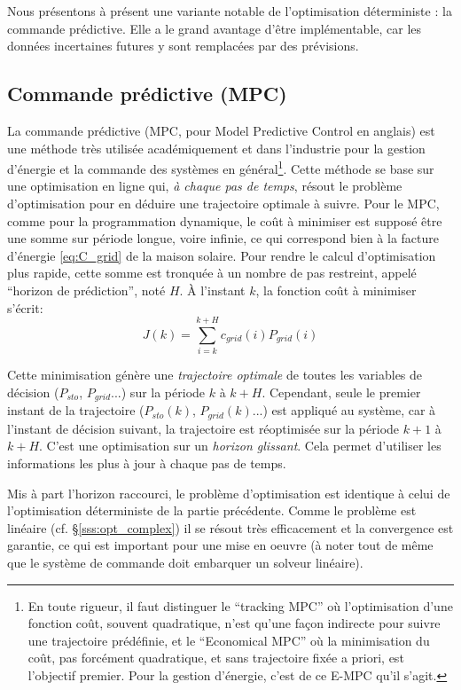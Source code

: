 \documentclass[a4paper,10pt,twocolumn]{article}
\begin{document}
Nous présentons à présent une variante notable de l'optimisation déterministe : la commande prédictive.
Elle a le grand avantage d'être implémentable, car les données incertaines futures y sont remplacées
par des prévisions.

\subsection{Commande prédictive (MPC)}
\label{ss:mpc}

La commande prédictive (MPC, pour Model Predictive Control en anglais)
est une méthode très utilisée académiquement et dans l'industrie
pour la gestion d'énergie et la commande des systèmes en général\footnote{
  En toute rigueur, il faut distinguer le
  ``tracking MPC'' où l'optimisation d'une fonction coût, souvent quadratique,
  n'est qu'une façon indirecte pour suivre une trajectoire prédéfinie,
  et le ``Economical MPC'' où la minimisation du coût, pas forcément quadratique,
  et sans trajectoire fixée a priori, est l'objectif premier.
  Pour la gestion d'énergie, c'est de ce E-MPC qu'il s'agit.}.
Cette méthode se base sur une optimisation en ligne qui, \emph{à chaque pas de temps},
résout le problème d'optimisation pour en déduire une trajectoire optimale à suivre.
Pour le MPC, comme pour la programmation dynamique, le coût à minimiser est supposé
être une somme sur période longue, voire infinie,
ce qui correspond bien à la facture d'énergie \eqref{eq:C_grid} de la maison solaire.
Pour rendre le calcul d'optimisation plus rapide,
cette somme est tronquée à un nombre de pas restreint,
appelé ``horizon de prédiction'', noté $H$.
À l'instant $k$, la fonction coût à minimiser s'écrit:
%
\begin{equation} \label{eq:mpc_cost}
  J(k) = \sum_{i=k}^{k+H} c_{grid}(i)P_{grid}(i)
\end{equation} 

Cette minimisation génère une \emph{trajectoire optimale}
de toutes les variables de décision ($P_{sto}$, $P_{grid}$...)
sur la période $k$ à $k+H$.
Cependant, seule le premier instant de la trajectoire ($P_{sto}(k)$, $P_{grid}(k)$...)
est appliqué au système, car à l'instant de décision suivant,
la trajectoire est réoptimisée sur la période $k+1$ à $k+H$.
C'est une optimisation sur un \emph{horizon glissant}.
Cela permet d'utiliser les informations les plus à jour à chaque pas de temps.

Mis à part l'horizon raccourci, le problème d'optimisation
est identique à celui de l'optimisation déterministe de la partie précédente.
Comme le problème est linéaire (cf. §\ref{sss:opt_complex}) il se résout très efficacement
et la convergence est garantie, ce qui est important pour une mise en oeuvre
(à noter tout de même que le système de commande doit embarquer un solveur linéaire).
\end{document}
